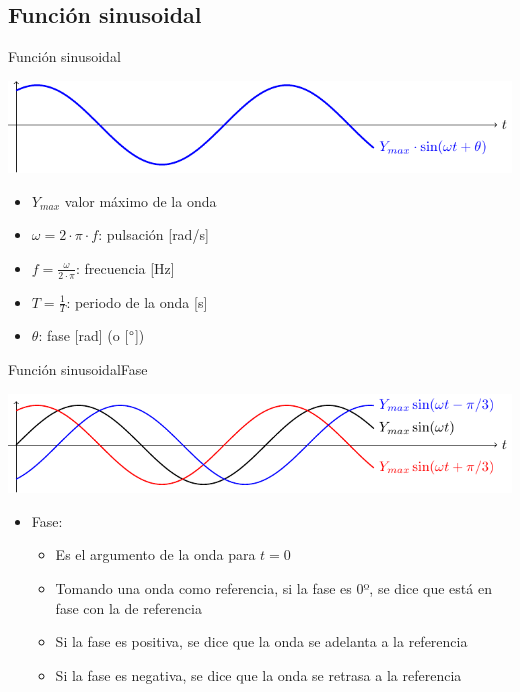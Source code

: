 \documentclass[aspectratio=169, xcolor={usenames,svgnames,dvipsnames}]{beamer}
\begin{document}
\subsection{Función sinusoidal}

\begin{frame}{Función sinusoidal}
\begin{center}
\includegraphics[width=.9\linewidth]{../figs/sin.pdf}
\end{center}

\begin{itemize}
\item \(Y_{max}\) valor máximo de la onda

\item \(\omega=2\cdot\pi\cdot f\): pulsación [rad/s]

\item \(f=\frac{\omega}{2\cdot\pi}\): frecuencia [Hz]

\item $T=\frac{1}{T}$: periodo de la onda [s]

\item \(\theta\): fase [rad] (o [$\si{}{\degree}$])
\end{itemize}
\end{frame}


\begin{frame}{Función sinusoidal}{Fase}
\begin{center}
\includegraphics[width=.9\linewidth]{../figs/desfase.pdf}
\end{center}

\begin{itemize}
\item Fase:
\begin{itemize}
\item Es el argumento de la onda para $t=0$

\item Tomando una onda como referencia, si la fase es 0º, se dice que
está \alert{en fase} con la de referencia

\item Si la fase es positiva, se dice que la onda \alert{se adelanta} a la referencia

\item Si la fase es negativa, se dice que la onda \alert{se retrasa} a la referencia
\end{itemize}
\end{itemize}
\end{frame}
\end{document}
